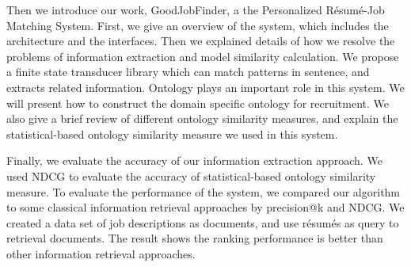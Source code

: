 Then we introduce our work, GoodJobFinder, a the Personalized R\'esum\'e-Job Matching System. First, we give an overview of the system, which includes the architecture and the interfaces. Then we explained details of how we resolve the problems of information extraction and model similarity calculation. We propose a finite state transducer library which can match patterns in sentence, and extracts related information. Ontology plays an important role in this system. We will present how to construct the domain specific ontology for recruitment. We also give a brief review of different ontology similarity measures, and explain the statistical-based ontology similarity measure we used in this system.

Finally, we evaluate the accuracy of our information extraction approach. We used NDCG to evaluate the accuracy of statistical-based ontology similarity measure. To evaluate the performance of the system, we compared our algorithm to some classical information retrieval approaches by precision@k and NDCG. We created a data set of job descriptions as documents, and use r\'esum\'es as query to retrieval documents. The result shows the ranking performance is better than other information retrieval approaches.
